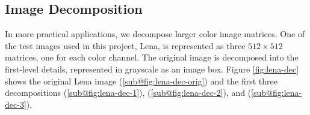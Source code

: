 \documentclass[12pt]{article}
\theoremstyle{definition}
\begin{document}

  \subsection{Image Decomposition}

  In more practical applications, we decompose larger color image matrices. One of the test images used in this project, Lena, is represented as three \(512 \times 512\) matrices, one for each color channel. The original image is decomposed into the first-level details, represented in grayscale as an image box.
  Figure \ref{fig:lena-dec} shows the original Lena image (\ref{sub@fig:lena-dec-orig}) and the first three decompositions (\ref{sub@fig:lena-dec-1}), (\ref{sub@fig:lena-dec-2}), and (\ref{sub@fig:lena-dec-3}).
  
\end{document}
